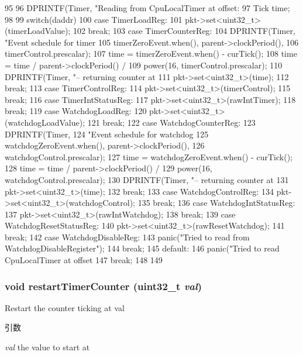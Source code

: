 \begin{DoxyCode}
95 {
96     DPRINTF(Timer, "Reading from CpuLocalTimer at offset: %
97     Tick time;
98 
99     switch(daddr) {
100       case TimerLoadReg:
101         pkt->set<uint32_t>(timerLoadValue);
102         break;
103       case TimerCounterReg:
104         DPRINTF(Timer, "Event schedule for timer %
105                 timerZeroEvent.when(), parent->clockPeriod(),
106                 timerControl.prescalar);
107         time = timerZeroEvent.when() - curTick();
108         time = time / parent->clockPeriod() /
109             power(16, timerControl.prescalar);
110         DPRINTF(Timer, "-- returning counter at %
111         pkt->set<uint32_t>(time);
112         break;
113       case TimerControlReg:
114         pkt->set<uint32_t>(timerControl);
115         break;
116       case TimerIntStatusReg:
117         pkt->set<uint32_t>(rawIntTimer);
118         break;
119       case WatchdogLoadReg:
120         pkt->set<uint32_t>(watchdogLoadValue);
121         break;
122       case WatchdogCounterReg:
123         DPRINTF(Timer,
124                 "Event schedule for watchdog %
125                 watchdogZeroEvent.when(), parent->clockPeriod(),
126                 watchdogControl.prescalar);
127         time = watchdogZeroEvent.when() - curTick();
128         time = time / parent->clockPeriod() /
129             power(16, watchdogControl.prescalar);
130         DPRINTF(Timer, "-- returning counter at %
131         pkt->set<uint32_t>(time);
132         break;
133       case WatchdogControlReg:
134         pkt->set<uint32_t>(watchdogControl);
135         break;
136       case WatchdogIntStatusReg:
137         pkt->set<uint32_t>(rawIntWatchdog);
138         break;
139       case WatchdogResetStatusReg:
140         pkt->set<uint32_t>(rawResetWatchdog);
141         break;
142       case WatchdogDisableReg:
143         panic("Tried to read from WatchdogDisableRegister\n");
144         break;
145       default:
146         panic("Tried to read CpuLocalTimer at offset %
147         break;
148     }
149 }
\end{DoxyCode}
\hypertarget{classCpuLocalTimer_1_1Timer_a520062c40a7a6907757be6a19ee1c0b7}{
\subsubsection[{restartTimerCounter}]{\setlength{\rightskip}{0pt plus 5cm}void restartTimerCounter ({\bf uint32\_\-t} {\em val})}}
\label{classCpuLocalTimer_1_1Timer_a520062c40a7a6907757be6a19ee1c0b7}
Restart the counter ticking at val 
\begin{DoxyParams}{引数}
\item[{\em val}]the value to start at \end{DoxyParams}



